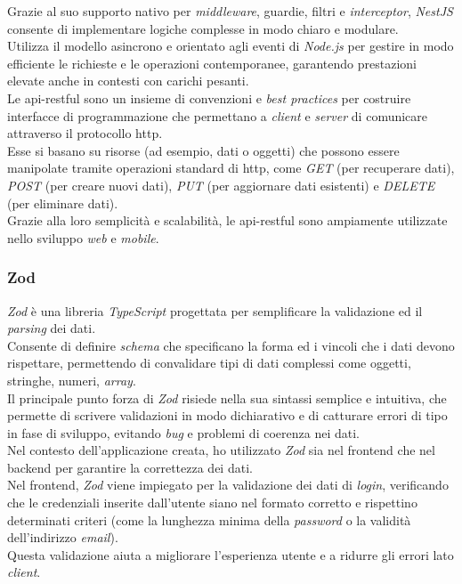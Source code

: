 \noindent Grazie al suo supporto nativo per \textit{middleware}, guardie, filtri e \textit{interceptor}, \textit{NestJS} consente di implementare logiche complesse in modo chiaro e modulare.\\
Utilizza il modello asincrono e orientato agli eventi di \textit{Node.js} per gestire in modo efficiente le richieste e le operazioni contemporanee, garantendo prestazioni elevate anche in contesti con carichi pesanti.\\

\noindent Le \gls{api-restful} sono un insieme di convenzioni e \textit{best practices} per costruire interfacce di programmazione che permettano a \textit{client} e \textit{server} di comunicare attraverso il protocollo \gls{http}.\\
Esse si basano su risorse (ad esempio, dati o oggetti) che possono essere manipolate tramite operazioni standard di \gls{http}, come \textit{GET} (per recuperare dati), \textit{POST} (per creare nuovi dati), \textit{PUT} (per aggiornare dati esistenti) e \textit{DELETE} (per eliminare dati).\\
Grazie alla loro semplicità e scalabilità, le \gls{api-restful} sono ampiamente utilizzate nello sviluppo \textit{web} e \textit{mobile}.

\subsubsection{Zod}

\textit{Zod} è una libreria \textit{TypeScript} progettata per semplificare la validazione ed il \textit{parsing} dei dati. \\
Consente di definire \textit{schema} che specificano la forma ed i vincoli che i dati devono rispettare, permettendo di convalidare tipi di dati complessi come oggetti, stringhe, numeri, \textit{array}.\\
Il principale punto forza di \textit{Zod} risiede nella sua sintassi semplice e intuitiva, che permette di scrivere validazioni in modo dichiarativo e di catturare errori di tipo in fase di sviluppo, evitando \textit{bug} e problemi di coerenza nei dati.\\

\noindent Nel contesto dell'applicazione creata, ho utilizzato \textit{Zod} sia nel \gls{frontend} che nel \gls{backend} per garantire la correttezza dei dati.\\
Nel \gls{frontend}, \textit{Zod} viene impiegato per la validazione dei dati di \textit{login}, verificando che le credenziali inserite dall'utente siano nel formato corretto e rispettino determinati criteri (come la lunghezza minima della \textit{password} o la validità dell'indirizzo \textit{email}).\\
Questa validazione aiuta a migliorare l'esperienza utente e a ridurre gli errori lato \textit{client}.\\


